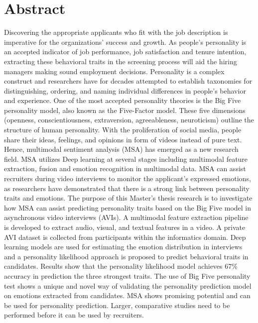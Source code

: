 \chapter*{Abstract}
Discovering the appropriate applicants who fit with the job description is imperative for the organizations' success and growth. As people's personality is an accepted indicator of job performance, job satisfaction and tenure intention, extracting these behavioral traits in the screening process will aid the hiring managers making sound employment decisions. Personality is a complex construct and researchers have for decades attempted to establish taxonomies for distinguishing, ordering, and naming individual differences in people's behavior and experience. One of the most accepted personality theories is the Big Five personality model, also known as the Five-Factor model. These five dimensions (openness, conscientiousness, extraversion, agreeableness, neuroticism) outline the structure of human personality. With the proliferation of social media, people share their ideas, feelings, and opinions in form of videos instead of pure text. Hence, multimodal sentiment analysis (MSA) has emerged as a new research field. MSA utilizes Deep learning at several stages including multimodal feature extraction, fusion and emotion recognition in multimodal data. MSA can assist recruiters during video interviews to monitor the applicant's expressed emotions, as researchers have demonstrated that there is a strong link between personality traits and emotions. The purpose of this Master's thesis research is to investigate how MSA can assist predicting personality traits based on the Big Five model in asynchronous video interviews (AVIs). A multimodal feature extraction pipeline is developed to extract audio, visual, and textual features in a video. A private AVI dataset is collected from participants within the informatics domain. Deep learning models are used for estimating the emotion distribution in interviews and a personality likelihood approach is proposed to predict behavioral traits in candidates. Results show that the personality likelihood model achieves 67\% accuracy in prediction the three strongest traits. The use of Big Five personality test shows a unique and novel way of validating the personality prediction model on emotions extracted from candidates. MSA shows promising potential and can be used for personality prediction. Larger, comparative studies need to be performed before it can be used by recruiters.  


